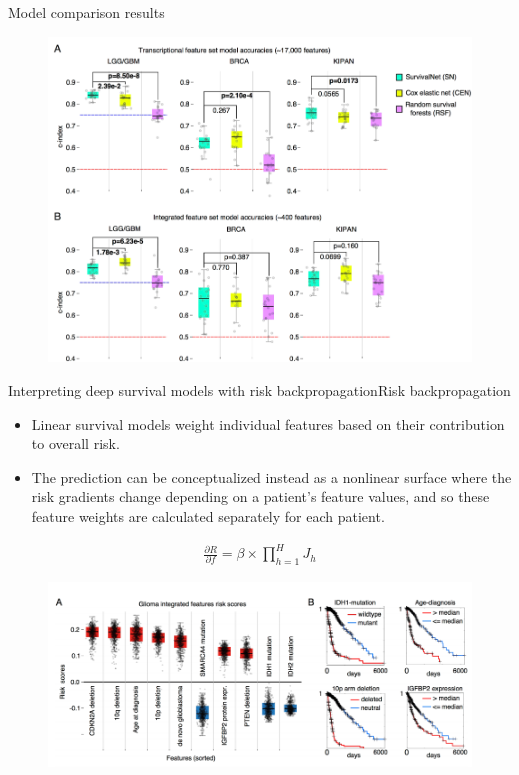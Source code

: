 \documentclass[
]{beamer}
\begin{document}
\begin{frame}{Model comparison results}
\begin{figure}
	\includegraphics[scale=0.4]{res1}
\end{figure}
\end{frame}

\begin{frame}{Interpreting deep survival models with risk backpropagation}{Risk backpropagation}
\begin{itemize}
	\item Linear survival models weight individual
	features based on their contribution to overall risk.
	\item  The prediction can be conceptualized instead as a nonlinear surface where the risk gradients change
	depending on a patient’s feature values, and so these feature weights are calculated separately for each patient.
\end{itemize}
\begin{align*}
\frac{\partial R}{\partial f}=\beta\times\prod_{h=1}^{H} J_h
\end{align*}
\end{frame}


\begin{frame}
\begin{figure}
	\includegraphics[scale=0.4]{fea1}
\end{figure}
\end{frame}
\end{document}
